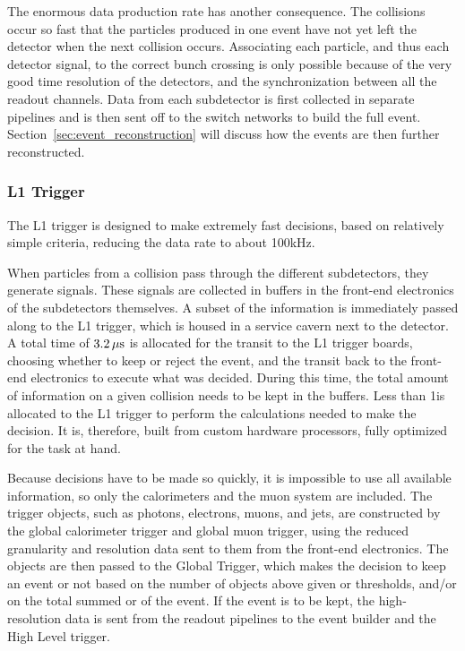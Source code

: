 The enormous data production rate has another consequence. The collisions occur so fast that the
particles produced in one event have not yet left the detector when the next collision occurs. 
Associating each particle, and thus each detector signal, to the correct bunch crossing is only
possible because of the very good time resolution of the detectors, and the synchronization between
all the readout channels. 
Data from each subdetector is first collected in separate pipelines and is then sent off to the
switch networks to build the full event. Section~\ref{sec:event_reconstruction} will discuss 
how the events are then further reconstructed.

\subsubsection{L1 Trigger \label{sec:cms_level_one}}

The L1 trigger is designed to make extremely fast decisions, based on relatively simple criteria,
reducing the data rate to about 100\unit{kHz}. 

When particles from a collision pass through the different subdetectors, they generate signals.
These signals are collected in buffers in the front-end electronics of the subdetectors themselves. 
A subset of the information is immediately passed along to the L1 trigger, which is housed
in a service cavern next to the detector. A total time of $3.2\,\mu\text{s}$ is allocated for the transit to
the L1 trigger boards, choosing whether to keep or reject the event, and the transit back to the
front-end electronics to execute what was decided. During this time, the total amount of information
on a given collision needs to be kept in the buffers.
Less than 1\mus is allocated to the L1 trigger to perform the calculations needed to make the
decision. It is, therefore, built from custom hardware processors, fully optimized for the task at
hand. 

Because decisions have to be made so quickly, it is impossible to use all available information, so
 only the calorimeters and the muon system are included. 
The trigger objects, such as photons, electrons, muons, and jets, are constructed by the global
calorimeter trigger and global muon trigger, using the reduced granularity and resolution data
sent to them from the front-end electronics. The objects are then passed to the Global Trigger,
which makes the decision to keep an event or not based on the number of objects above given \ET
or \pt thresholds, and/or on the total summed \ET or \ETm of the event. If the event is to be kept,
the high-resolution data is sent from the readout pipelines to the event builder and the High
Level trigger. 

